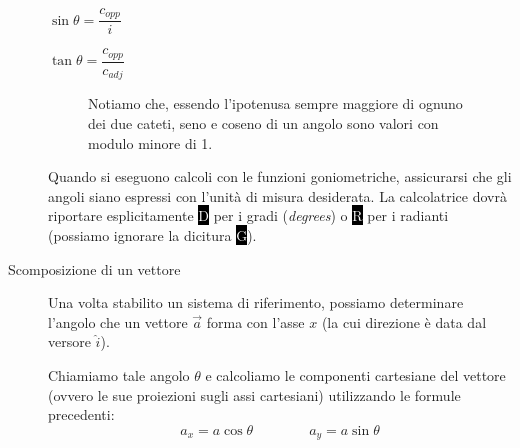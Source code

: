 \documentclass[a4paper,11pt,italian]{article}
\begin{document}
\begin{description}
\begin{multicols}{3}
\begin{center}
  $ \sin\theta = \dfrac{c_{opp}}{i} $
  
  $ \tan\theta = \dfrac{c_{opp}}{c_{adj}} $
  \end{center}
\end{multicols}
  \begin{figure}[htb]\centering
  \caption{Notiamo che, essendo l'ipotenusa sempre maggiore di ognuno dei due cateti, seno e coseno di un angolo sono valori con modulo minore di 1.}
  \end{figure}
  
  Quando si eseguono calcoli con le funzioni goniometriche, assicurarsi che gli angoli siano espressi con l'unità di misura desiderata. 
  La calcolatrice dovrà riportare esplicitamente \colorbox{black}{\textcolor{white}{D}} per i gradi (\emph{degrees}) o \colorbox{black}{\textcolor{white}{R}} per i radianti (possiamo ignorare la dicitura \colorbox{black}{\textcolor{white}{G}}).
  
  \item[Scomposizione di un vettore]
  Una volta stabilito un sistema di riferimento, possiamo determinare l'angolo che un vettore $ \vec{a} $ forma con l'asse $ x $ (la cui direzione è data dal versore $ \hat{i} $).
  
  Chiamiamo tale angolo $ \theta $ e calcoliamo le componenti cartesiane del vettore (ovvero le sue proiezioni sugli assi cartesiani) utilizzando le formule precedenti:
  \[ a_x = a  \cos\theta \quad\quad\quad\quad a_y = a  \sin\theta \]
  

\end{description}
\end{document}
